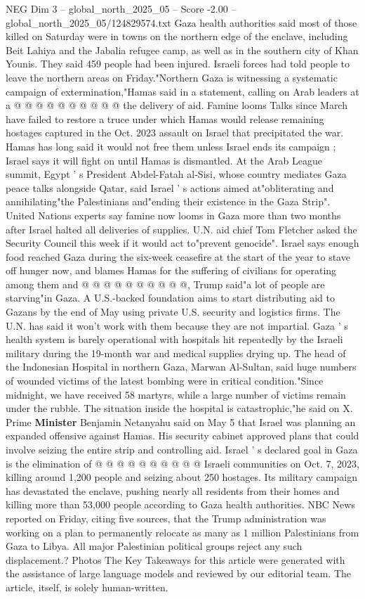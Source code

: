 \begin{textsample}{NEG Dim 3 – global\_north\_2025\_05 – Score -2.00 – global\_north\_2025\_05/124829574.txt}
Gaza health authorities said most of those killed on Saturday were in towns on the northern edge of the enclave, including Beit Lahiya and the Jabalia refugee camp, as well as in the southern city of Khan Younis.
They said 459 people had been injured.
Israeli forces had told people to leave the northern areas on Friday."Northern Gaza is witnessing a systematic campaign of extermination,"Hamas said in a statement, calling on Arab leaders at a @ @ @ @ @ @ @ @ @ @ the delivery of aid.
Famine looms Talks since March have failed to restore a truce under which Hamas would release remaining hostages captured in the Oct. 2023 assault on Israel that precipitated the war.
Hamas has long said it would not free them unless Israel ends its campaign ; Israel says it will fight on until Hamas is dismantled.
At the Arab League summit, Egypt ' s President Abdel-Fatah al-Sisi, whose country mediates Gaza peace talks alongside Qatar, said Israel ' s actions aimed at"obliterating and annihilating"the Palestinians and"ending their existence in the Gaza Strip".
United Nations experts say famine now looms in Gaza more than two months after Israel halted all deliveries of supplies.
U.N. aid chief Tom Fletcher asked the Security Council this week if it would act to"prevent genocide".
Israel says enough food reached Gaza during the six-week ceasefire at the start of the year to stave off hunger now, and blames Hamas for the suffering of civilians for operating among them and @ @ @ @ @ @ @ @ @ @, Trump said"a lot of people are starving"in Gaza.
A U.S.-backed foundation aims to start distributing aid to Gazans by the end of May using private U.S. security and logistics firms.
The U.N. has said it won't work with them because they are not impartial.
Gaza ' s health system is barely operational with hospitals hit repeatedly by the Israeli military during the 19-month war and medical supplies drying up.
The head of the Indonesian Hospital in northern Gaza, Marwan Al-Sultan, said huge numbers of wounded victims of the latest bombing were in critical condition."Since midnight, we have received 58 martyrs, while a large number of victims remain under the rubble.
The situation inside the hospital is catastrophic,"he said on X.
Prime \textbf{Minister} Benjamin Netanyahu said on May 5 that Israel was planning an expanded offensive against Hamas.
His security cabinet approved plans that could involve seizing the entire strip and controlling aid.
Israel ' s declared goal in Gaza is the elimination of @ @ @ @ @ @ @ @ @ @ Israeli communities on Oct. 7, 2023, killing around 1,200 people and seizing about 250 hostages.
Its military campaign has devastated the enclave, pushing nearly all residents from their homes and killing more than 53,000 people according to Gaza health authorities.
NBC News reported on Friday, citing five sources, that the Trump administration was working on a plan to permanently relocate as many as 1 million Palestinians from Gaza to Libya.
All major Palestinian political groups reject any such displacement.?
Photos The Key Takeaways for this article were generated with the assistance of large language models and reviewed by our editorial team.
The article, itself, is solely human-written.


\end{textsample}

